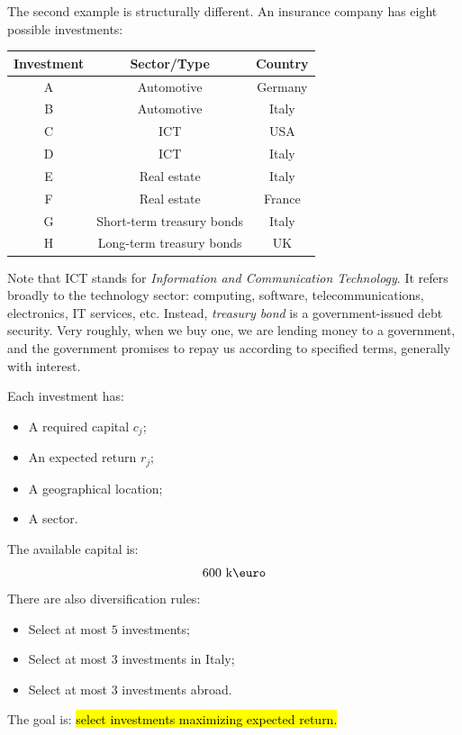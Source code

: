 \highspace
\begin{examplebox}\label{example:portfolio-selection}
    The second example is structurally different. An insurance company has eight possible investments:
    \begin{center}
        \begin{tabular}{@{} c c c @{}}
            \toprule
            \textbf{Investment} & \textbf{Sector/Type} & \textbf{Country} \\
            \midrule
            A & Automotive                & Germany \\[.3em]
            B & Automotive                & Italy   \\[.3em]
            C & ICT                       & USA     \\[.3em]
            D & ICT                       & Italy   \\[.3em]
            E & Real estate               & Italy   \\[.3em]
            F & Real estate               & France  \\[.3em]
            G & Short-term treasury bonds & Italy   \\[.3em]
            H & Long-term treasury bonds  & UK      \\
            \bottomrule
        \end{tabular}
    \end{center}
    Note that ICT stands for \emph{Information and Communication Technology}. It refers broadly to the technology sector: computing, software, telecommunications, electronics, IT services, etc. Instead, \emph{treasury bond} is a government-issued debt security. Very roughly, when we buy one, we are lending money to a government, and the government promises to repay us according to specified terms, generally with interest.

    \highspace
    Each investment has:
    \begin{itemize}
        \item A required capital $c_j$;
        \item An expected return $r_j$;
        \item A geographical location;
        \item A sector.
    \end{itemize}
    The available capital is:
    \begin{equation*}
        600\text{ k\euro}
    \end{equation*}
    There are also diversification rules:
    \begin{itemize}
        \item Select at most $5$ investments;
        \item Select at most $3$ investments in Italy;
        \item Select at most $3$ investments abroad.
    \end{itemize}
    The goal is: \hl{select investments maximizing expected return.}


\end{examplebox}
